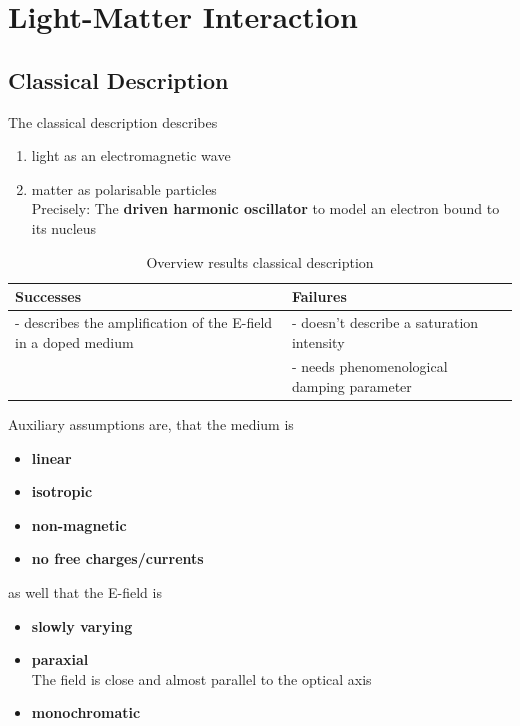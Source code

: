 \documentclass{article}
\begin{document}
\newpage


\section{Light-Matter Interaction}
\subsection{Classical Description}
The classical description describes
	\begin{enumerate}
		\item light as an electromagnetic wave
		\item matter as polarisable particles\\
		Precisely: The \textbf{driven harmonic oscillator} to model an electron bound to its nucleus
	\end{enumerate}


\begin{table}[h]
	\centering
	\caption{Overview results classical description}
	\begin{tabularx}{\textwidth}{X|X}
		\hline\hline
			Successes & Failures \\
		\hline
			- describes the amplification of the E-field in a doped medium & - doesn't describe a saturation intensity \\
		\hline
			& - needs phenomenological damping parameter \\
		\hline\hline	
	\end{tabularx}
\end{table}


Auxiliary assumptions are, that the medium is
	\begin{itemize}
		\item \textbf{linear}
		
		
		\item \textbf{isotropic}
		
		
		\item \textbf{non-magnetic}
		
		
		\item \textbf{no free charges/currents}
	\end{itemize}

as well that the E-field is
	\begin{itemize}
		\item \textbf{slowly varying}
		
		
		\item \textbf{paraxial}\\
		The field is close and almost parallel to the optical axis
		
		
		\item \textbf{monochromatic}
	\end{itemize}
\end{document}
